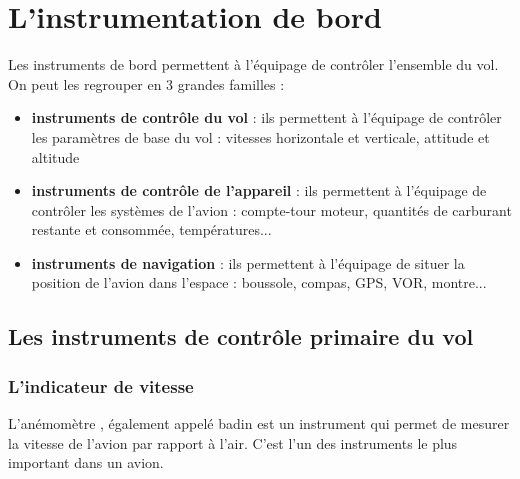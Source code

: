 

\section{L'instrumentation de bord}
	Les instruments de bord  permettent à l'équipage de contrôler l'ensemble du vol. On peut les regrouper en 3 grandes familles :
	\begin{itemize}
		\item \textbf{instruments de contrôle du vol} : ils permettent à l'équipage de contrôler les paramètres de base du vol : vitesses horizontale et verticale, attitude et altitude
		\item \textbf{instruments de contrôle de l'appareil} : ils permettent à l'équipage de contrôler les systèmes de l'avion : compte-tour moteur, quantités de carburant restante et consommée, températures...
		\item \textbf{instruments de navigation} : ils permettent à l'équipage de situer la position de l'avion dans l'espace : boussole, compas, GPS, VOR, montre...
	\end{itemize}
	
	\subsection{Les instruments de contrôle primaire du vol}
	\subsubsection{L'indicateur de vitesse}
	 L'\gls{anémomètre} , également appelé \gls{badin} est un instrument qui permet de mesurer la vitesse de l'avion par rapport à l'air. C'est l'un des instruments le plus important dans un avion. 

	\begin{figure}[H]	
	\centering
	\end{figure}
	
	
